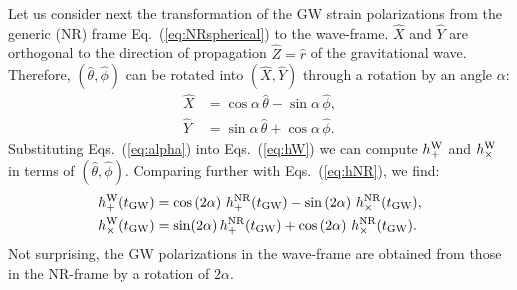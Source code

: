 \documentclass[11pt,tightenlines,article,amssymb,amsmath,amsfonts,superscriptaddress]{revtex4}
\newcommand{\ErNR}{{\hat r}}
\newcommand{\EtNR}{{\hat\theta}}
\newcommand{\EpNR}{{\hat\phi}}
\newcommand{\hpNR}{h_+^{\rm NR}}
\newcommand{\hcNR}{h_{\times}^{\rm NR}}
\newcommand{\tGW}{t_{\rm GW}}
\newcommand{\ExW}{\hat X}
\newcommand{\EyW}{\hat Y}
\newcommand{\EzW}{\hat Z}
\newcommand{\hpW}{h_+^{\rm W}}
\newcommand{\hcW}{h_\times^{\rm W}}
\begin{document}
Let us consider next the transformation of the GW strain polarizations
from the generic (NR) frame Eq.~(\ref{eq:NRspherical}) to the
wave-frame.  $\ExW$ and $\EyW$ are orthogonal to the direction of
propagation $\EzW=\ErNR$ of the gravitational wave.  Therefore,
$(\EtNR, \EpNR)$ can be rotated into $(\ExW, \EyW)$ through a rotation
by an angle $\alpha$:
\begin{subequations}\label{eq:alpha}
\begin{align}
\ExW & = \cos\alpha\,\EtNR - \sin\alpha\,\EpNR,\\
\label{eq:alphaY}
\EyW & = \sin\alpha\,\EtNR +\cos\alpha\,\EpNR.
\end{align}
\end{subequations}
Substituting Eqs.~(\ref{eq:alpha}) into Eqs.~(\ref{eq:hW}) we can compute $\hpW$ and $\hcW$ in terms of $(\EtNR,\EpNR)$.  Comparing further with Eqs.~(\ref{eq:hNR}), we find:
\begin{subequations}
\label{eq:PolarizationTrafo}
\begin{align}
  \hpW(\tGW) &= \cos\left(2\alpha\right)\,\hpNR(\tGW) -\sin\left(2\alpha\right)\,\hcNR(\tGW),\\
  \hcW(\tGW) &= \sin(2\alpha)\,\hpNR(\tGW)+\cos\left(2\alpha\right)\,\hcNR(\tGW).
\end{align}
\end{subequations}
Not surprising, the GW polarizations in the wave-frame are obtained
from those in the NR-frame by a rotation of $2\alpha$.
\end{document}
